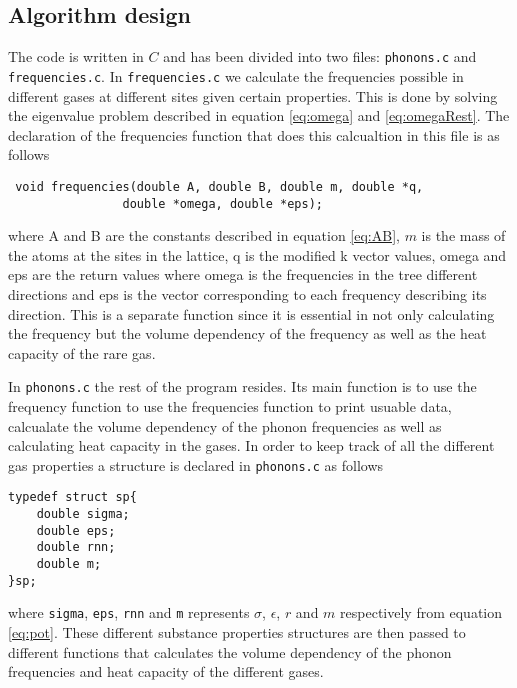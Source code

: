 \documentclass[11pt]{article}
\begin{document}
\subsection{Algorithm design}
The code is written in $C$ and has been divided into two files: \verb+phonons.c+ and \verb+frequencies.c+. In \verb+frequencies.c+ we calculate the frequencies possible in different gases at different sites given certain properties. This is done by solving the eigenvalue problem described in equation \ref{eq:omega} and \ref{eq:omegaRest}. The declaration of the frequencies function that does this calcualtion in this file is as follows
\begin{lstlisting}
 void frequencies(double A, double B, double m, double *q, 
				double *omega, double *eps);
\end{lstlisting}
where A and B are the constants described in equation \ref{eq:AB}, $m$ is the mass of the atoms at the sites in the lattice, q is the modified k vector values, omega and eps are the return values where omega is the frequencies in the tree different directions and eps is the vector corresponding to each frequency describing its direction. This is a separate function since it is essential in not only calculating the frequency but the volume dependency of the frequency as well as the heat capacity of the rare gas. 

In \verb+phonons.c+ the rest of the program resides. Its main function is to use the frequency function to use the frequencies function to print usuable data, calcualate the volume dependency of the phonon frequencies as well as calculating heat capacity in the gases. In order to keep track of all the different gas properties a structure is declared in \verb+phonons.c+ as follows
\begin{lstlisting}
typedef struct sp{
	double sigma;
	double eps;
	double rnn;
	double m;
}sp;
\end{lstlisting}
where \verb+sigma+, \verb+eps+, \verb+rnn+ and \verb+m+ represents $\sigma$, $\epsilon$, $r$ and $m$ respectively from equation \ref{eq:pot}. These different substance properties structures are then passed to different functions that calculates the volume dependency of the phonon frequencies and heat capacity of the different gases.
\end{document}
